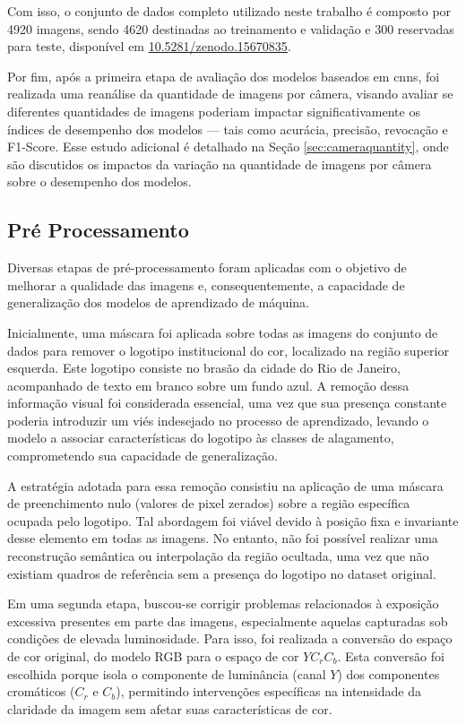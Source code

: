Com isso, o conjunto de dados completo utilizado neste trabalho é composto por 4920 imagens, sendo 4620 destinadas ao treinamento e validação e 300 reservadas para teste, disponível em \href{https://doi.org/10.5281/zenodo.15670835}{10.5281/zenodo.15670835}.

Por fim, após a primeira etapa de avaliação dos modelos baseados em \acrshort{cnn}s, foi realizada uma reanálise da quantidade de imagens por câmera, visando avaliar se diferentes quantidades de imagens poderiam impactar significativamente os índices de desempenho dos modelos — tais como acurácia, precisão, revocação e F1-Score. Esse estudo adicional é detalhado na Seção \ref{sec:cameraquantity}, onde são discutidos os impactos da variação na quantidade de imagens por câmera sobre o desempenho dos modelos.
\subsection{Pré Processamento}\label{subsec:datapreprocessing}

Diversas etapas de pré-processamento foram aplicadas com o objetivo de melhorar a qualidade das imagens e, consequentemente, a capacidade de generalização dos modelos de aprendizado de máquina.

Inicialmente, uma máscara foi aplicada sobre todas as imagens do conjunto de dados para remover o logotipo institucional do \acrshort{cor}, localizado na região superior esquerda. Este logotipo consiste no brasão da cidade do Rio de Janeiro, acompanhado de texto em branco sobre um fundo azul. A remoção dessa informação visual foi considerada essencial, uma vez que sua presença constante poderia introduzir um viés indesejado no processo de aprendizado, levando o modelo a associar características do logotipo às classes de alagamento, comprometendo sua capacidade de generalização.

A estratégia adotada para essa remoção consistiu na aplicação de uma máscara de preenchimento nulo (valores de pixel zerados) sobre a região específica ocupada pelo logotipo. Tal abordagem foi viável devido à posição fixa e invariante desse elemento em todas as imagens. No entanto, não foi possível realizar uma reconstrução semântica ou interpolação da região ocultada, uma vez que não existiam quadros de referência sem a presença do logotipo no dataset original.

Em uma segunda etapa, buscou-se corrigir problemas relacionados à exposição excessiva presentes em parte das imagens, especialmente aquelas capturadas sob condições de elevada luminosidade. Para isso, foi realizada a conversão do espaço de cor original, do modelo RGB para o espaço de cor $YC_rC_b$. Esta conversão foi escolhida porque isola o componente de luminância (canal $Y$) dos componentes cromáticos ($C_r$ e $C_b$), permitindo intervenções específicas na intensidade da claridade da imagem sem afetar suas características de cor.

